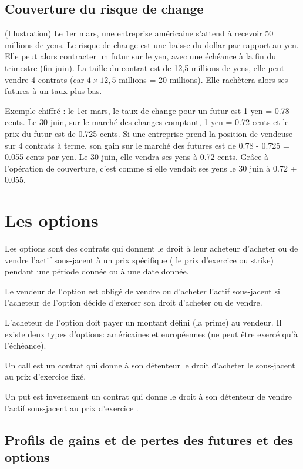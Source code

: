 	\subsection{Couverture du risque de change}
	
	(Illustration) Le 1er mars, une entreprise américaine s'attend à recevoir 50 millions de yens. Le risque de change est une baisse du dollar par rapport au yen. Elle peut alors contracter un futur sur le yen, avec une échéance à la fin du trimestre (fin juin). La taille du contrat est de 12,5 millions de yens, elle peut vendre 4 contrats (car $4 \times 12,5$ millions = 20 millions). Elle rachètera alors ses futures à un taux plus bas.

	Exemple chiffré : le 1er mars, le taux de change pour un futur est 1 yen = 0.78 cents. Le 30 juin, sur le marché des changes comptant, 1 yen = 0.72 cents et le prix du futur est de 0.725 cents. Si une entreprise prend la position de vendeuse sur 4 contrats à terme, son gain sur le marché des futures est de 0.78 - 0.725 = 0.055 cents par yen. Le 30 juin, elle vendra ses yens à 0.72 cents. Grâce à l'opération de couverture, c'est comme si elle vendait ses yens le 30 juin à 0.72 + 0.055.
	
	
\section{Les options}

Les options sont des contrats qui donnent le droit à leur acheteur d'acheter 
ou de vendre l'actif sous-jacent à un prix spécifique ( le prix d'exercice ou 
strike) pendant une période donnée ou à une date donnée. 

Le vendeur de l'option est obligé de vendre ou d'acheter l'actif sous-jacent 
si l'acheteur de l'option décide d'exercer son droit d'acheter ou de vendre.

L'acheteur de l'option doit payer un montant défini (la prime) au vendeur. Il existe deux types d'options: américaines et européennes (ne peut être exercé qu'à l'échéance).

Un call est un contrat qui donne à son détenteur le droit d'acheter le sous-jacent au prix d'exercice fixé. 

Un put est inversement un contrat qui donne le droit à son détenteur de 
vendre l'actif sous-jacent au prix d'exercice .

	\subsection{Profils de gains et de pertes des futures et des options}
	
